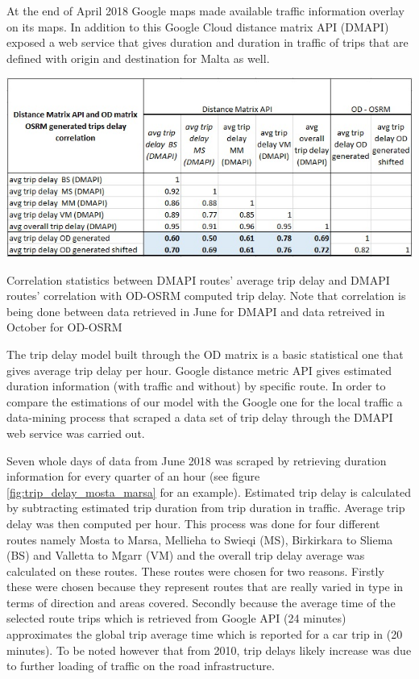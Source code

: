 \documentclass[12pt, a4paper]{report}
\theoremstyle{definition}
\theoremstyle{definition}%
\theoremstyle{definition}%
\theoremstyle{definition}%
\theoremstyle{definition}%
\theoremstyle{definition}%
\begin{document}
At the end of April 2018 Google maps made available traffic information overlay on its maps. In addition to this Google Cloud distance matrix API  (DMAPI) exposed a web service that gives duration and duration in traffic of trips that are defined with origin and destination for Malta as well.

\begin{table}[!]	
	\includegraphics[scale=0.7]{trip_delay_correlation_DMAPI_vs_MINE.jpg}
	\centering
	\caption[Trip delay correlation statistics between DMAPI and OD-OSRM]{Correlation statistics between DMAPI routes' average trip delay and DMAPI routes' correlation with OD-OSRM computed trip delay. Note that correlation is being done between data retrieved in June for DMAPI and data retreived in October for OD-OSRM}
	\label{table:trip_delay_google_vs_mine}
\end{table}


The trip delay model built through the OD matrix is a basic statistical one that gives average trip delay per hour. Google distance metric API gives estimated duration information (with traffic and without) by specific route. In order to compare the estimations of our model with the Google one for the local traffic a data-mining process that scraped a data set of trip delay through the DMAPI web service was carried out. 

Seven whole days of data from June 2018 was scraped by retrieving duration information for every quarter of an hour (see figure \ref{fig:trip_delay_mosta_marsa} for an example). Estimated trip delay is calculated by subtracting estimated trip duration from trip duration in traffic. Average trip delay was then computed per hour. This process was done for four different routes namely Mosta to Marsa, Mellieha to Swieqi (MS), Birkirkara to Sliema (BS) and Valletta to Mgarr (VM) and the overall trip delay average was calculated on these routes. These routes were chosen for two reasons. Firstly these were chosen because they represent routes that are really varied in type in terms of direction and areas covered. Secondly because the average time of the selected route trips which is retrieved from Google API (24 minutes) approximates the global trip average time which is reported for a car trip in \cite{malta2011national} (20 minutes). To be noted however that from 2010, trip delays likely increase was due to further loading of traffic on the road infrastructure.
\end{document}
